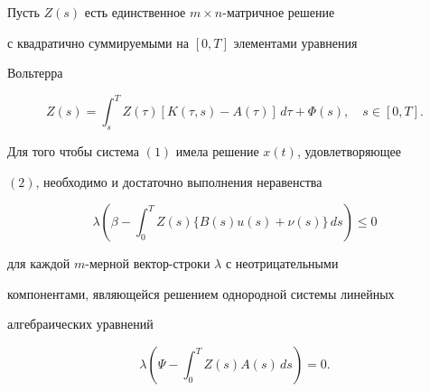 \begin{thm}


Пусть $Z(s)$ есть единственное $m\times n$-матричное решение


с квадратично суммируемыми на $[0,T]$ элементами уравнения


Вольтерра


\begin{equation}


Z(s) = \int_s^T Z(\tau)[K(\tau,s) - A(\tau)]\,d\tau + \Phi(s),


\quad s\in[0,T]. 


\end{equation}


Для того чтобы система $(1)$ имела решение $x(t)$, удовлетворяющее


$(2)$, необходимо и достаточно выполнения неравенства


\begin{equation}


\lambda(\beta - \int_0^T Z(s)\{B(s)u(s) + \nu(s)\}\,ds) \le 0 


\end{equation}


для каждой $m$-мерной вектор-строки $\lambda$ с неотрицательными


компонентами, являющейся решением однородной системы линейных


алгебраических уравнений


\begin{equation}


\lambda(\Psi - \int_0^T Z(s)A(s)\,ds) = 0.


\end{equation}


\end{thm}





